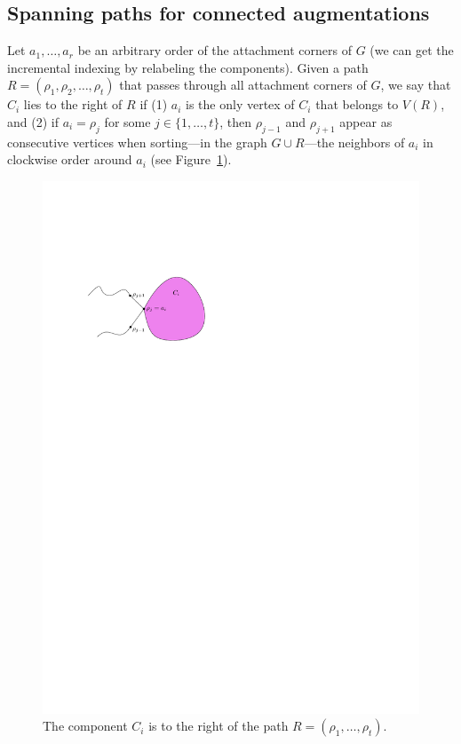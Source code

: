 \documentclass[11pt]{patmorin}
\begin{document}
\subsection{Spanning paths for connected augmentations}\label{section:Spanning paths for connected augmentations}
Let $a_1, \ldots, a_r$ be an arbitrary order of the attachment corners of $G$ (we can get the incremental indexing by relabeling the components). 
Given a path $R = (\rho_1, \rho_2, \ldots, \rho_t)$ that passes through all attachment corners of $G$, we say that $C_i$ lies to the right of $R$ if (1) $a_i$ is the only vertex of $C_i$ that belongs to $V(R)$, and (2) if $a_i = \rho_j$ for some $j\in\{1,\ldots,t\}$, then $\rho_{j-1}$ and $\rho_{j+1}$ appear as consecutive vertices when sorting---in the graph $G\cup R$---the neighbors of $a_i$ in clockwise order around $a_i$ (see Figure~\ref{figure:right-of}).


\begin{figure}
\centering
  \includegraphics{img/right-of}
  \caption{The component $C_i$ is to the right of the path $R=(\rho_1,\ldots,\rho_t)$.}
   \label{figure:right-of}
\end{figure}
\end{document}
